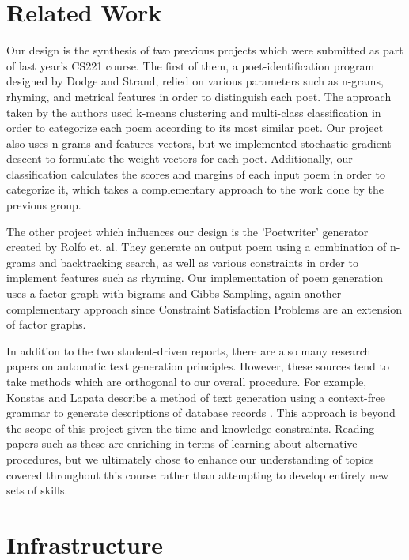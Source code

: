 \documentclass[journal]{IEEEtran}
\begin{document}
\section{Related Work}
Our design is the synthesis of two previous projects which were submitted as part of last year’s CS221 course. The first of them, a poet-identification program designed by Dodge and Strand, relied on various parameters such as n-grams, rhyming, and metrical features in order to distinguish each poet\cite{Dodge:article_typical}. The approach taken by the authors used k-means clustering and multi-class classification in order to categorize each poem according to its most similar poet. Our project also uses n-grams and features vectors, but we implemented stochastic gradient descent to formulate the weight vectors for each poet. Additionally, our classification calculates the scores and margins of each input poem in order to categorize it, which takes a complementary approach to the work done by the previous group.

The other project which influences our design is the 'Poetwriter' generator created by Rolfo et. al\cite{Rolfo:article_typical}. They generate an output poem using a combination of n-grams and backtracking search, as well as various constraints in order to implement features such as rhyming. Our implementation of poem generation uses a factor graph with bigrams and Gibbs Sampling, again another complementary approach since Constraint Satisfaction Problems are an extension of factor graphs.

In addition to the two student-driven reports, there are also many research papers on automatic text generation principles. However, these sources tend to take methods which are orthogonal to our overall procedure. For example, Konstas and Lapata describe a method of text generation using a context-free grammar to generate descriptions of database records \cite{Konstas:article_typical}. This approach is beyond the scope of this project given the time and knowledge constraints. Reading papers such as these are enriching in terms of learning about alternative procedures, but we ultimately chose to enhance our understanding of topics covered throughout this course rather than attempting to develop entirely new sets of skills.

\section{Infrastructure}
\end{document}
